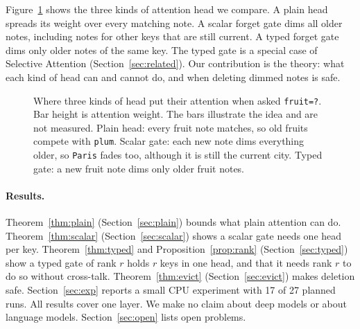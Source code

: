 \documentclass[10pt]{article}
\theoremstyle{definition}
\theoremstyle{remark}
\begin{document}
Figure~\ref{fig:idea} shows the three kinds of attention head we compare. A plain head spreads its weight over every matching note. A scalar forget gate dims all older notes, including notes for other keys that are still current. A typed forget gate dims only older notes of the same key. The typed gate is a special case of Selective Attention \cite{selective} (Section~\ref{sec:related}). Our contribution is the theory: what each kind of head can and cannot do, and when deleting dimmed notes is safe.

\begin{figure}[t]
\centering
{}
\caption{Where three kinds of head put their attention when asked \texttt{fruit=?}. Bar height is attention weight. The bars illustrate the idea and are not measured. Plain head: every fruit note matches, so old fruits compete with \texttt{plum}. Scalar gate: each new note dims everything older, so \texttt{Paris} fades too, although it is still the current city. Typed gate: a new fruit note dims only older fruit notes.}
\label{fig:idea}
\end{figure}

\paragraph{Results.} Theorem~\ref{thm:plain} (Section~\ref{sec:plain}) bounds what plain attention can do. Theorem~\ref{thm:scalar} (Section~\ref{sec:scalar}) shows a scalar gate needs one head per key. Theorem~\ref{thm:typed} and Proposition~\ref{prop:rank} (Section~\ref{sec:typed}) show a typed gate of rank $r$ holds $r$ keys in one head, and that it needs rank $r$ to do so without cross-talk. Theorem~\ref{thm:evict} (Section~\ref{sec:evict}) makes deletion safe. Section~\ref{sec:exp} reports a small CPU experiment with 17 of 27 planned runs. All results cover one layer. We make no claim about deep models or about language models. Section~\ref{sec:open} lists open problems.
\end{document}
